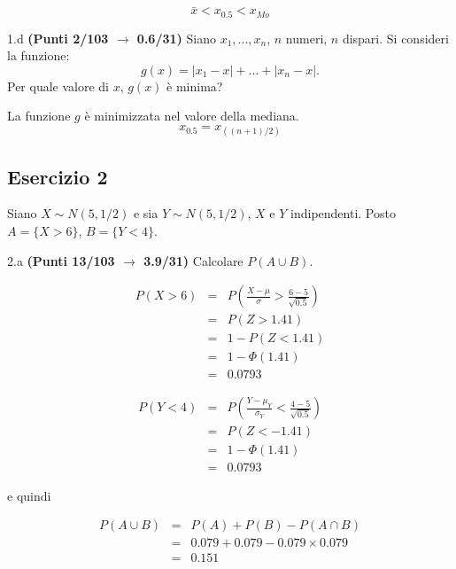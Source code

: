 \documentclass[
  11pt,
]{book}
\theoremstyle{mytheoremstyle}
\theoremstyle{mydefstyle}
\newenvironment{sol}
  {
  \begin{tcolorbox}[enhanced,breakable,arc=0.1mm,boxrule=1pt,colback=white,colframe=iblue,
  title=\bf \fontfamily{lmss}\selectfont \hspace{.5 cm} Soluzione,drop fuzzy shadow]

}{
\end{tcolorbox}
  }
\begin{document}
\begin{sol}
\[\bar x<x_{0.5}<x_{Mo}\]

\end{sol}

1.d \textbf{(Punti 2/103 \(\rightarrow\) 0.6/31)} Siano \(x_1,...,x_n\), \(n\) numeri, \(n\) dispari.
Si consideri la funzione:
\[g(x)=|x_1-x|+...+|x_n-x|.\]
Per quale valore di \(x\), \(g(x)\) è minima?

\begin{sol}
La funzione \(g\) è minimizzata nel valore della mediana.
\[x_{0.5}=x_{((n+1)/2)}\]

\end{sol}

\subsection{Esercizio 2}\label{esercizio-2-16}

Siano \(X\sim N(5,1/2)\) e sia \(Y\sim N(5,1/2)\), \(X\) e \(Y\) indipendenti. Posto \(A=\{X>6\}\), \(B=\{Y<4\}\).

2.a \textbf{(Punti 13/103 \(\rightarrow\) 3.9/31)} Calcolare \(P(A\cup B)\).

\begin{sol}
\begin{eqnarray*}
      P( X   >   6 ) 
        &=& P\left(  \frac { X  -  \mu }{ \sigma }  >  \frac { 6  -  5 }{\sqrt{ 0.5 }} \right)  \\
                 &=& P\left(  Z   >   1.41 \right) \\    &=& 1-P(Z< 1.41 )\\ 
                 &=&  1-\Phi( 1.41 ) \\ &=&  0.0793 
      \end{eqnarray*}

\begin{eqnarray*}
      P( Y   <   4 ) 
        &=& P\left(  \frac { Y  -  \mu_Y }{ \sigma_Y }  <  \frac { 4  -  5 }{\sqrt{ 0.5 }} \right)  \\
                 &=& P\left(  Z   <   -1.41 \right) \\    
                 &=&  1-\Phi( 1.41 ) \\ &=&  0.0793 
      \end{eqnarray*}

e quindi

\begin{eqnarray*}
  P(A\cup B) &=&  P(A)+P(B)-P(A\cap B)\\
  &=& 0.079+0.079-0.079\times0.079\\
  &=& 0.151 
\end{eqnarray*}

\end{sol}
\end{document}
